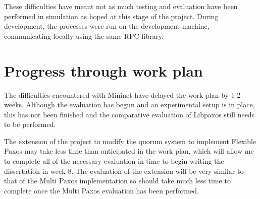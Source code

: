 \documentclass[11pt,a4]{report}
\begin{document}
These difficulties have meant not as much testing and evaluation have been performed in simulation as hoped at this stage of the project. During development, the processes were run on the development machine, communicating locally using the same RPC library.

\section*{Progress through work plan}
The difficulties encountered with Mininet have delayed the work plan by 1-2 weeks. Although the evaluation has begun and an experimental setup is in place, this has not been finished and the comparative evaluation of Libpaxos still needs to be performed.

The extension of the project to modify the quorum system to implement Flexible Paxos may take less time than anticipated in the work plan, which will allow me to complete all of the necessary evaluation in time to begin writing the dissertation in week 8. The evaluation of the extension will be very similar to that of the Multi Paxos implementation so should take much less time to complete once the Multi Paxos evaluation has been performed.
\end{document}
